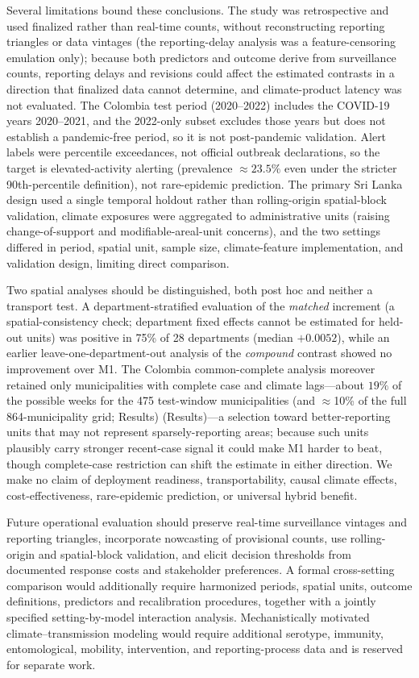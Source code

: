 \documentclass[11pt,a4paper]{article}
\begin{document}
Several limitations bound these conclusions. The study was retrospective and used finalized rather than real-time counts, without reconstructing reporting triangles or data vintages (the reporting-delay analysis was a feature-censoring emulation only); because both predictors and outcome derive from surveillance counts, reporting delays and revisions could affect the estimated contrasts in a direction that finalized data cannot determine, and climate-product latency was not evaluated. The Colombia test period (2020--2022) includes the COVID-19 years 2020--2021, and the 2022-only subset excludes those years but does not establish a pandemic-free period, so it is not post-pandemic validation. Alert labels were percentile exceedances, not official outbreak declarations, so the target is elevated-activity alerting (prevalence $\approx23.5\%$ even under the stricter 90th-percentile definition), not rare-epidemic prediction. The primary Sri Lanka design used a single temporal holdout rather than rolling-origin spatial-block validation, climate exposures were aggregated to administrative units (raising change-of-support and modifiable-areal-unit concerns), and the two settings differed in period, spatial unit, sample size, climate-feature implementation, and validation design, limiting direct comparison.

Two spatial analyses should be distinguished, both post hoc and neither a transport test. A department-stratified evaluation of the \emph{matched} increment (a spatial-consistency check; department fixed effects cannot be estimated for held-out units) was positive in 75\% of 28 departments (median $+0.0052$), while an earlier leave-one-department-out analysis of the \emph{compound} contrast showed no improvement over M1. The Colombia common-complete analysis moreover retained only municipalities with complete case and climate lags---about $19\%$ of the possible weeks for the 475 test-window municipalities (and $\approx$10\% of the full 864-municipality grid; Results) (Results)---a selection toward better-reporting units that may not represent sparsely-reporting areas; because such units plausibly carry stronger recent-case signal it could make M1 harder to beat, though complete-case restriction can shift the estimate in either direction. We make no claim of deployment readiness, transportability, causal climate effects, cost-effectiveness, rare-epidemic prediction, or universal hybrid benefit.

Future operational evaluation should preserve real-time surveillance vintages and reporting triangles, incorporate nowcasting of provisional counts, use rolling-origin and spatial-block validation, and elicit decision thresholds from documented response costs and stakeholder preferences. A formal cross-setting comparison would additionally require harmonized periods, spatial units, outcome definitions, predictors and recalibration procedures, together with a jointly specified setting-by-model interaction analysis. Mechanistically motivated climate--transmission modeling would require additional serotype, immunity, entomological, mobility, intervention, and reporting-process data and is reserved for separate work.
\end{document}
